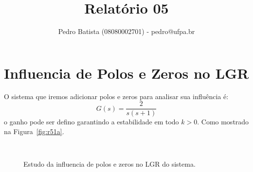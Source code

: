 \documentclass[a4paper]{article}
\title{Relatório 05}
\author{Pedro Batista (08080002701) - pedro@ufpa.br}
\begin{document}
\maketitle

\section{Influencia de Polos e Zeros no LGR}

O sistema que iremos adicionar polos e zeros para analisar sua influência é:
\begin{equation}
G(s)=\frac{2}{s(s+1)}
\label{eq:r51}
\end{equation}
o ganho pode ser defino garantindo a estabilidade em todo $k>0$. Como
mostrado na Figura~\ref{fig:r51a}.

\begin{figure}[h]
   \\
   \caption{Estudo da influencia de polos e zeros no LGR do sistema.}
   \label{fig:r51}
\end{figure}
\end{document}
